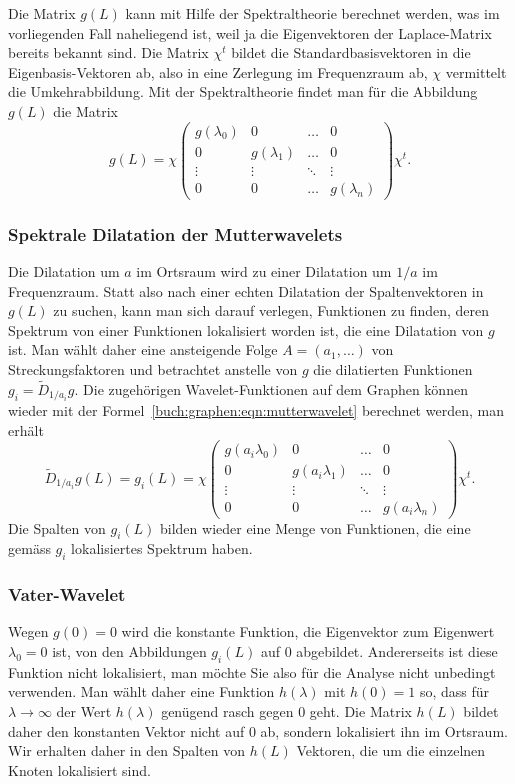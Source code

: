 Die Matrix $g(L)$ kann mit Hilfe der Spektraltheorie berechnet werden,
was im vorliegenden Fall naheliegend ist, weil ja die Eigenvektoren 
der Laplace-Matrix bereits bekannt sind.
Die Matrix $\chi^t$ bildet die Standardbasisvektoren in die
Eigenbasis-Vektoren ab, also in eine Zerlegung im Frequenzraum ab,
$\chi$ vermittelt die Umkehrabbildung.
Mit der Spektraltheorie findet man für die Abbildung $g(L)$ die Matrix
\begin{equation}
g(L)
=
\chi
\begin{pmatrix}
g(\lambda_0)&0&\dots&0\\
0&g(\lambda_1)&\dots&0\\
\vdots&\vdots&\ddots&\vdots\\
0&0&\dots&g(\lambda_n)
\end{pmatrix}
\chi^t.
\label{buch:graphen:eqn:mutterwavelet}
\end{equation}

\subsubsection{Spektrale Dilatation der Mutterwavelets}
Die Dilatation um $a$ im Ortsraum wird zu einer Dilatation um $1/a$ im
Frequenzraum.
Statt also nach einer echten Dilatation der Spaltenvektoren in $g(L)$
zu suchen, kann man sich darauf verlegen, Funktionen zu finden, deren
Spektrum von einer Funktionen lokalisiert worden ist, die eine Dilatation
von $g$ ist.
Man wählt daher eine ansteigende Folge $A=(a_1,\dots)$ von Streckungsfaktoren
und betrachtet anstelle von $g$ die dilatierten Funktionen
$g_i=\tilde{D}_{1/a_i}g$.
Die zugehörigen Wavelet-Funktionen auf dem Graphen können wieder mit
der Formel~\eqref{buch:graphen:eqn:mutterwavelet} berechnet werden,
man erhält
\begin{equation}
\tilde{D}_{1/a_i}g(L)
=
g_i(L)
=
\chi
\begin{pmatrix}
g(a_i\lambda_0)&0&\dots&0\\
0&g(a_i\lambda_1)&\dots&0\\
\vdots&\vdots&\ddots&\vdots\\
0&0&\dots&g(a_i\lambda_n)
\end{pmatrix}
\chi^t .
\end{equation}
Die Spalten von $g_i(L)$ bilden wieder eine Menge von Funktionen, die
eine gemäss $g_i$ lokalisiertes Spektrum haben.

\subsubsection{Vater-Wavelet}
Wegen $g(0)=0$ wird die konstante Funktion, die Eigenvektor zum Eigenwert
$\lambda_0=0$ ist, von den Abbildungen $g_i(L)$ auf $0$ abgebildet.
Andererseits ist diese Funktion nicht lokalisiert, man möchte Sie also
für die Analyse nicht unbedingt verwenden.
Man wählt daher eine Funktion $h(\lambda)$ mit $h(0)=1$ so, dass
für $\lambda\to \infty$ der Wert $h(\lambda)$ genügend rasch gegen $0$
geht.
Die Matrix $h(L)$ bildet daher den konstanten Vektor nicht auf $0$ ab,
sondern lokalisiert ihn im Ortsraum.
Wir erhalten daher in den Spalten von $h(L)$ Vektoren, die um die
einzelnen Knoten lokalisiert sind.

